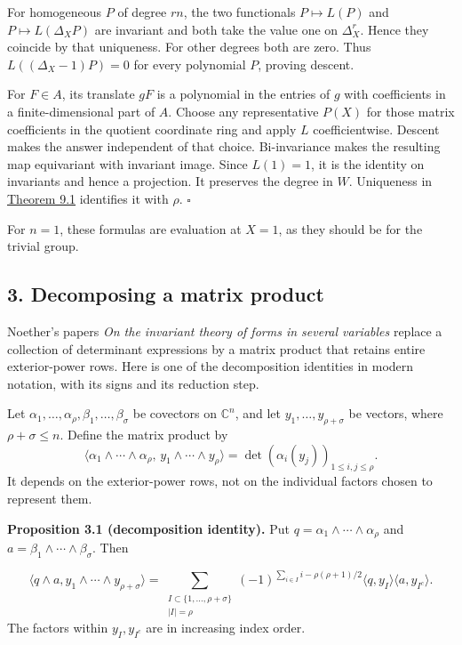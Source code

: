 \documentclass[
]{article}
\begin{document}
For homogeneous \(P\) of degree \(rn\), the two functionals
\(P\mapsto L(P)\) and \(P\mapsto L(\Delta_XP)\) are invariant and both
take the value one on \(\Delta_X^r\). Hence they coincide by that
uniqueness. For other degrees both are zero. Thus \(L((\Delta_X-1)P)=0\)
for every polynomial \(P\), proving descent.

For \(F\in A\), its translate \(gF\) is a polynomial in the entries of
\(g\) with coefficients in a finite-dimensional part of \(A\). Choose
any representative \(P(X)\) for those matrix coefficients in the
quotient coordinate ring and apply \(L\) coefficientwise. Descent makes
the answer independent of that choice. Bi-invariance makes the resulting
map equivariant with invariant image. Since \(L(1)=1\), it is the
identity on invariants and hence a projection. It preserves the degree
in \(W\). Uniqueness in \href{NOE-INV-01.html\#theorem-9-1}{Theorem 9.1}
identifies it with \(\rho\). \(\square\)

For \(n=1\), these formulas are evaluation at \(X=1\), as they should be
for the trivial group.

\subsection{3. Decomposing a matrix product}\label{section-3}

Noether's papers \emph{On the invariant theory of forms in several
variables} replace a collection of determinant expressions by a matrix
product that retains entire exterior-power rows. Here is one of the
decomposition identities in modern notation, with its signs and its
reduction step.

Let \(\alpha_1,\ldots,\alpha_\rho,\beta_1,\ldots,\beta_\sigma\) be
covectors on \(\mathbb C^n\), and let \(y_1,\ldots,y_{\rho+\sigma}\) be
vectors, where \(\rho+\sigma\leq n\). Define the matrix product by \[
\langle\alpha_1\wedge\cdots\wedge\alpha_\rho,\,
y_1\wedge\cdots\wedge y_\rho\rangle
=\det(\alpha_i(y_j))_{1\leq i,j\leq\rho}.
\] It depends on the exterior-power rows, not on the individual factors
chosen to represent them.

\protect{}\label{proposition-3-1}{}

\textbf{Proposition 3.1 (decomposition identity).} Put
\(q=\alpha_1\wedge\cdots\wedge\alpha_\rho\) and
\(a=\beta_1\wedge\cdots\wedge\beta_\sigma\). Then
\protect{}\label{equation-H7}{}

\[
\langle q\wedge a,y_1\wedge\cdots\wedge y_{\rho+\sigma}\rangle
=\sum_{\substack{I\subset\{1,\ldots,\rho+\sigma\}\\|I|=\rho}}
(-1)^{\sum_{i\in I}i-\rho(\rho+1)/2}
\langle q,y_I\rangle\langle a,y_{I^c}\rangle.
\tag{H7}
\] The factors within \(y_I,y_{I^c}\) are in increasing index order.
\end{document}
